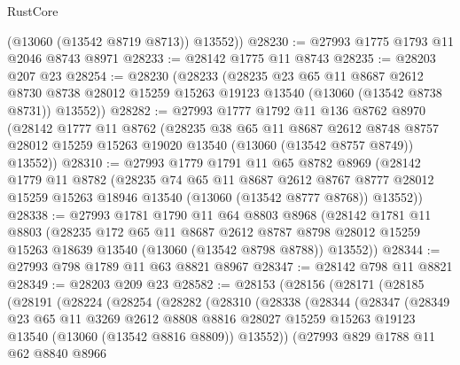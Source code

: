 \begin{lexlean}{RustCore}
\begin{coremodule}
        (@13060 (@13542 @8719 @8713))
        @13552))
@28230 := @27993 @1775 @1793 @11 @2046 @8743 @8971
@28233 := @28142 @1775 @11 @8743
@28235 := @28203 @207 @23
@28254 := @28230
    (@28233
      (@28235
        @23
        @65
        @11
        @8687
        @2612
        @8730
        @8738
        @28012
        @15259
        @15263
        @19123
        @13540
        (@13060 (@13542 @8738 @8731))
        @13552))
@28282 := @27993
    @1777
    @1792
    @11
    @136
    @8762
    @8970
    (@28142
      @1777
      @11
      @8762
      (@28235
        @38
        @65
        @11
        @8687
        @2612
        @8748
        @8757
        @28012
        @15259
        @15263
        @19020
        @13540
        (@13060 (@13542 @8757 @8749))
        @13552))
@28310 := @27993
    @1779
    @1791
    @11
    @65
    @8782
    @8969
    (@28142
      @1779
      @11
      @8782
      (@28235
        @74
        @65
        @11
        @8687
        @2612
        @8767
        @8777
        @28012
        @15259
        @15263
        @18946
        @13540
        (@13060 (@13542 @8777 @8768))
        @13552))
@28338 := @27993
    @1781
    @1790
    @11
    @64
    @8803
    @8968
    (@28142
      @1781
      @11
      @8803
      (@28235
        @172
        @65
        @11
        @8687
        @2612
        @8787
        @8798
        @28012
        @15259
        @15263
        @18639
        @13540
        (@13060 (@13542 @8798 @8788))
        @13552))
@28344 := @27993 @798 @1789 @11 @63 @8821 @8967
@28347 := @28142 @798 @11 @8821
@28349 := @28203 @209 @23
@28582 := @28153
    (@28156
      (@28171
        (@28185
          (@28191
            (@28224
              (@28254
                (@28282
                  (@28310
                    (@28338
                      (@28344
                        (@28347
                          (@28349
                            @23
                            @65
                            @11
                            @3269
                            @2612
                            @8808
                            @8816
                            @28027
                            @15259
                            @15263
                            @19123
                            @13540
                            (@13060 (@13542 @8816 @8809))
                            @13552))
                        (@27993
                          @829
                          @1788
                          @11
                          @62
                          @8840
                          @8966

\end{coremodule}
\end{lexlean}
